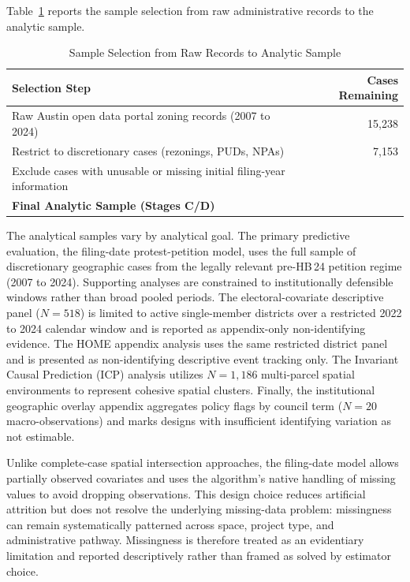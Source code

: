 \documentclass[11pt, letterpaper]{article}
\begin{document}


Table~\ref{tab:attrition} reports the sample selection from raw administrative records to the analytic sample.

\begin{table}[H]
\centering
\caption{Sample Selection from Raw Records to Analytic Sample}
\label{tab:attrition}
\begin{tabular}{l r}
\toprule
\textbf{Selection Step} & \textbf{Cases Remaining} \\
\midrule
Raw Austin open data portal zoning records (2007 to 2024) & 15,238 \\
Restrict to discretionary cases (rezonings, PUDs, NPAs) & 7,153 \\
Exclude cases with unusable or missing initial filing-year information & \metricBaselineCases{} \\
\midrule
\textbf{Final Analytic Sample (Stages C/D)} & \textbf{\metricBaselineCases{}} \\
\bottomrule
\end{tabular}
\end{table}

The analytical samples vary by analytical goal. The primary predictive evaluation, the filing-date protest-petition model, uses the full sample of \metricBaselineCases{} discretionary geographic cases from the legally relevant pre-HB\,24 petition regime (2007 to 2024). Supporting analyses are constrained to institutionally defensible windows rather than broad pooled periods. The electoral-covariate descriptive panel ($N=518$) is limited to active single-member districts over a restricted 2022 to 2024 calendar window and is reported as appendix-only non-identifying evidence. The HOME appendix analysis uses the same restricted district panel and is presented as non-identifying descriptive event tracking only. The Invariant Causal Prediction (ICP) analysis utilizes $N=1,186$ multi-parcel spatial environments to represent cohesive spatial clusters. Finally, the institutional geographic overlay appendix aggregates policy flags by council term ($N=20$ macro-observations) and marks designs with insufficient identifying variation as not estimable.

Unlike complete-case spatial intersection approaches, the filing-date model allows partially observed covariates and uses the algorithm's native handling of missing values to avoid dropping observations. This design choice reduces artificial attrition but does not resolve the underlying missing-data problem: missingness can remain systematically patterned across space, project type, and administrative pathway. Missingness is therefore treated as an evidentiary limitation and reported descriptively rather than framed as solved by estimator choice.
\end{document}

